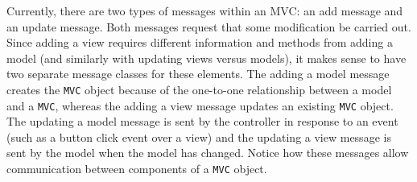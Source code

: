 \documentclass[11pt]{article}
\newcommand{\Robject}[1]{{\texttt{#1}}}
\begin{document}
Currently, there are two types of messages within an MVC: an add
message and an update message.  Both messages request that some
modification be carried out.  Since adding a view requires different
information and methods from adding a model (and similarly with
updating views versus models), it makes sense to have two separate
message classes for these elements.  The adding a model message creates the
\Robject{MVC} object because of the one-to-one relationship between a model
and a \Robject{MVC}, whereas the adding a view message updates an
existing \Robject{MVC} object.  The updating a model message is sent by the
controller in response to an event (such as a button click event over a view)
and the updating a view message is sent by the model when the model has
changed.  Notice how these messages allow communication between components
of a \Robject{MVC} object.
\end{document}
